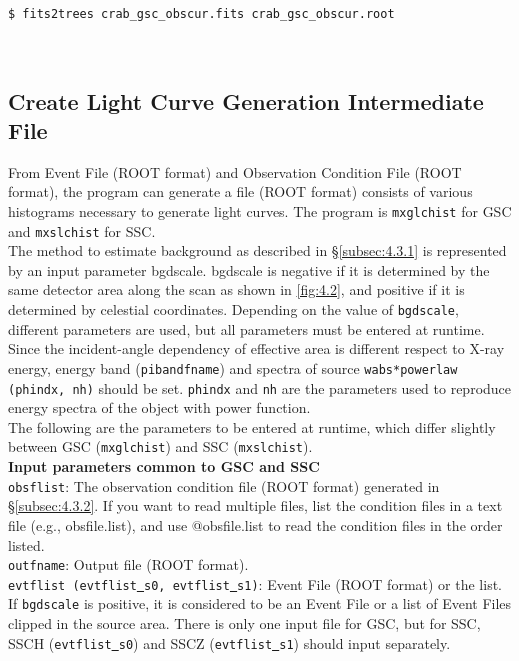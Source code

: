 \documentclass[10pt]{report}
\makeatletter
\renewcommand{\_}{\textscale{.5}{\textbf{\textunderscore}}}
\newcommand{\at}{\makeatletter @\makeatother}
\makeatother
\begin{document}
\begin{lstlisting}
$ fits2trees crab_gsc_obscur.fits crab_gsc_obscur.root
\end{lstlisting}

\

\subsection{Create Light Curve Generation Intermediate File}\label{subsec:4.3.3}

From Event File (ROOT format) and Observation Condition File (ROOT format), the program can generate a file (ROOT format) consists of various histograms necessary to generate light curves. The program is \texttt{mxglchist} for GSC and \texttt{mxslchist} for SSC. \\
\indent The method to estimate background as described in \S\ref{subsec:4.3.1} is represented by an input parameter bgdscale. bgdscale is negative if it is determined by the same detector area along the scan as shown in \ref{fig:4.2}, and positive if it is determined by celestial coordinates. Depending on the value of \texttt{bgdscale}, different parameters are used, but all parameters must be entered at runtime. \\
\indent Since the incident-angle dependency of effective area is different respect to X-ray energy, energy band (\texttt{pibandfname}) and spectra of source \texttt{wabs*powerlaw (phindx, nh)} should be set. \texttt{phindx} and \texttt{nh} are the parameters used to reproduce energy spectra of the object with power function.\\
\indent The following are the parameters to be entered at runtime, which differ slightly between GSC (\texttt{mxglchist}) and SSC (\texttt{mxslchist}). \\

\noindent\textbf{Input parameters common to GSC and SSC} \\

\noindent \texttt{obsflist}: The observation condition file (ROOT format) generated in \S\ref{subsec:4.3.2}. If you want to read multiple files, list the condition files in a text file (e.g., obsfile.list), and use \at obsfile.list to read the condition files in the order listed. \\

\noindent \texttt{outfname}: Output file (ROOT format).\\

\noindent \texttt{evtflist (evtflist\underline{ }s0, evtflist\underline{ }s1)}: Event File (ROOT format) or the list. If \texttt{bgdscale} is positive, it is considered to be an Event File or a list of Event Files clipped in the source area. There is only one input file for GSC, but for SSC, SSC\_H (\texttt{evtflist\underline{ }s0}) and SSC\_Z (\texttt{evtflist\underline{ }s1}) should input separately.\\
\end{document}
